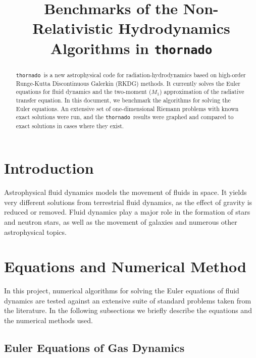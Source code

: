 \documentclass[10pt]{article}
\newcommand{\thornado}{\texttt{thornado}}
\begin{document}
\title{Benchmarks of the Non-Relativistic Hydrodynamics Algorithms in \thornado}


\maketitle

\begin{abstract}
\thornado\ is a new astrophysical code for radiation-hydrodynamics based on high-order Runge-Kutta Discontinuous Galerkin (RKDG) methods.  
It currently solves the Euler equations for fluid dynamics and the two-moment ($M_{1}$) approximation of the radiative transfer equation. 
In this document, we benchmark the algorithms for solving the Euler equations.  
An extensive set of one-dimensional Riemann problems with known exact solutions were run, and the \thornado\ results were graphed and compared to exact solutions in cases where they exist. 
\end{abstract}

\tableofcontents

\section{Introduction}

Astrophysical fluid dynamics models the movement of fluids in space. It yields very different solutions from terrestrial fluid dynamics, as the effect of gravity is reduced or removed. 
Fluid dynamics play a major role in the formation of stars and neutron stars, as well as the movement of galaxies and numerous other astrophysical topics.  

\section{Equations and Numerical Method}

In this project, numerical algorithms for solving the Euler equations of fluid dynamics are tested against an extensive suite of standard problems taken from the literature.  
In the following subsections we briefly describe the equations and the numerical methods used.  

\subsection{Euler Equations of Gas Dynamics}
\end{document}
